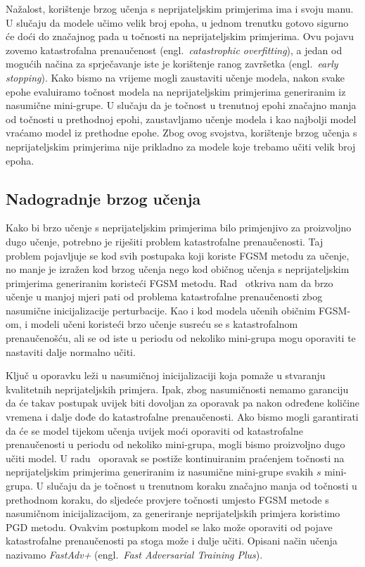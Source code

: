 \documentclass[times, utf8, zavrsni, numeric]{fer}
\begin{document}
Nažalost, korištenje brzog učenja s neprijateljskim primjerima ima i svoju manu. U slučaju da modele učimo velik broj epoha,
u jednom trenutku gotovo sigurno će doći do značajnog pada u točnosti na neprijateljskim primjerima. Ovu pojavu zovemo katastrofalna prenaučenost (engl.\ \textit{catastrophic overfitting}),
a jedan od mogućih načina za sprječavanje iste je korištenje ranog završetka (engl.\ \textit{early stopping}). 
Kako bismo na vrijeme mogli zaustaviti učenje modela, nakon svake epohe evaluiramo točnost modela na neprijateljskim primjerima generiranim iz nasumične mini-grupe.
U slučaju da je točnost u trenutnoj epohi značajno manja od točnosti u prethodnoj epohi, zaustavljamo učenje modela i kao najbolji model vraćamo model iz prethodne epohe.
Zbog ovog svojstva, korištenje brzog učenja s neprijateljskim primjerima nije prikladno za modele koje trebamo učiti velik broj epoha.

\subsection{Nadogradnje brzog učenja}

Kako bi brzo učenje s neprijateljskim primjerima bilo primjenjivo za proizvoljno dugo učenje, potrebno je riješiti problem katastrofalne prenaučenosti.
Taj problem pojavljuje se kod svih postupaka koji koriste FGSM metodu za učenje, no manje je izražen kod brzog učenja nego kod običnog učenja s neprijateljskim primjerima generiranim koristeći FGSM metodu.
Rad~\cite{li2020towards} otkriva nam da brzo učenje u manjoj mjeri pati od problema katastrofalne prenaučenosti zbog nasumične inicijalizacije perturbacije.
Kao i kod modela učenih običnim FGSM-om, i modeli učeni koristeći brzo učenje susreću se s katastrofalnom prenaučenošću, ali se od iste u periodu od nekoliko mini-grupa mogu oporaviti te nastaviti dalje normalno učiti.

Ključ u oporavku leži u nasumičnoj inicijalizaciji koja pomaže u stvaranju kvalitetnih neprijateljskih primjera. 
Ipak, zbog nasumičnosti nemamo garanciju da će takav postupak uvijek biti dovoljan za oporavak pa nakon određene količine vremena i dalje dođe do katastrofalne prenaučenosti.
Ako bismo mogli garantirati da će se model tijekom učenja uvijek moći oporaviti od katastrofalne prenaučenosti u periodu od nekoliko mini-grupa, mogli bismo proizvoljno dugo učiti model.
U radu~\cite{li2020towards} oporavak se postiže kontinuiranim praćenjem točnosti na neprijateljskim primjerima generiranim iz nasumične mini-grupe svakih $s$ mini-grupa. 
U slučaju da je točnost u trenutnom koraku značajno manja od točnosti u prethodnom koraku, do sljedeće provjere točnosti umjesto FGSM metode s nasumičnom inicijalizacijom, za generiranje neprijateljskih primjera koristimo PGD metodu.
Ovakvim postupkom model se lako može oporaviti od pojave katastrofalne prenaučenosti pa stoga može i dulje učiti.
Opisani način učenja nazivamo \textit{FastAdv+} (engl.\ \textit{Fast Adversarial Training Plus}).
\end{document}

